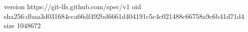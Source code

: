 version https://git-lfs.github.com/spec/v1
oid sha256:dbaa3d031684cca66df492bd6661d404191c5c4c021488c66758a9c6b41d71d4
size 1048672
